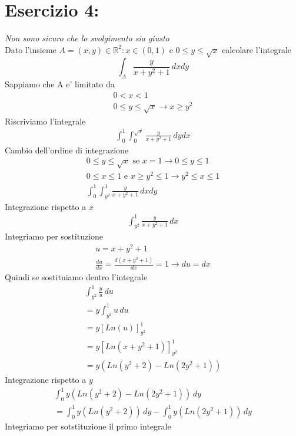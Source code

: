 \documentclass{article}
\begin{document}
\pagebreak
\section*{Esercizio 4:}
\textit{Non sono sicuro che lo svolgimento sia giusto} \\
Dato l'insieme $A={(x,y)\in \mathbb{R}^2 : x \in (0,1) \text{ e } 0\leq y \leq \sqrt{x}}$ calcolare l'integrale
\begin{equation*}
    \int_A \frac{y}{x+y^2+1} \,dxdy
\end{equation*}
Sappiamo che A e’ limitato da
\begin{align*}
    0 < x < 1 \\
    0 \leq y \leq \sqrt{x} \to x\geq y^2
\end{align*}
Riscriviamo l'integrale
\begin{align*}
    \int_0^1 \int_0^{\sqrt{x}} \frac{y}{x+y^2+1} \,dydx
\end{align*}
Cambio dell'ordine di integrazione
\begin{align*}
    0 \leq y \leq \sqrt{x} \text{ se } x=1 \to 0 \leq y \leq 1 \\
    0 \leq x \leq 1 \text{ e } x\geq y^2 \leq 1 \to y^2 \leq x \leq 1 \\
    \int_0^{1}\int_{y^2}^1  \frac{y}{x+y^2+1} \,dxdy
\end{align*}
Integrazione rispetto a $x$
\begin{align*}
    \int_{y^2}^1  \frac{y}{x+y^2+1} \,dx
\end{align*}
Integriamo per sostituzione
\begin{align*}
    u=x+y^2+1 \\
    \frac{du}{dx}=\frac{d(x+y^2+1)}{dx}=1 \to du=dx
\end{align*}
Quindi se sostituiamo dentro l'integrale
\begin{align*}
    \int_{y^2}^1  \frac{y}{u} \,du \\
    = y \int_{y^2}^1 u \,du \\
    = y[Ln(u)]_{y^2}^1 \\
    = y[Ln(x+y^2+1)]_{y^2}^1 \\
    =y(Ln(y^2+2)-Ln(2y^2+1))
\end{align*}
Integrazione rispetto a $y$
\begin{align*}
    \int_0^1 y(Ln(y^2+2)-Ln(2y^2+1)) \,dy \\
    =  \int_0^1 y(Ln(y^2+2)) \,dy - \int_0^1 y(Ln(2y^2+1)) \,dy
\end{align*}
Integriamo per sotstituzione il primo integrale
\end{document}
